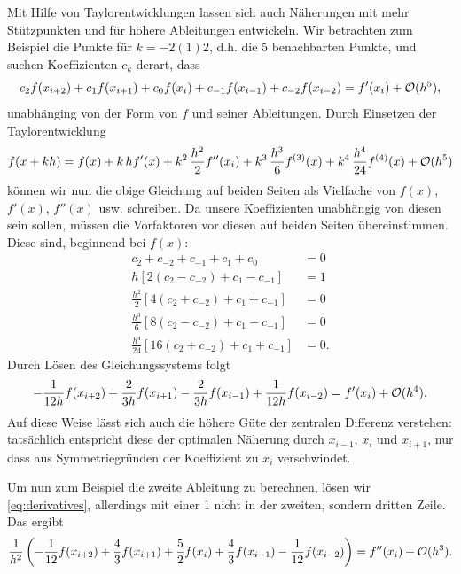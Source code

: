 Mit Hilfe von Taylorentwicklungen lassen sich auch Näherungen mit mehr
Stützpunkten und für höhere Ableitungen entwickeln.  Wir betrachten
zum Beispiel die Punkte für $k=-2(1)2$, d.h. die 5 benachbarten
Punkte, und suchen Koeffizienten $c_k$ derart, dass
\begin{equation}
  c_2 f(x_{i+2}) + c_1 f(x_{i+1})  + c_0 f(x_i) + c_{-1}f(x_{i-1}) +
  c_{-2}f(x_{i-2}) = f'(x_i) + \mathcal O(h^5),
\end{equation}
unabhänging von der Form von $f$ und seiner Ableitungen. Durch
Einsetzen der Taylorentwicklung
\begin{equation}
  f(x + k h) = f(x) + k\, hf'(x) + k^2\,\frac{h^2}{2} f''(x_i) +
  k^3\,\frac{h^3}{6}f^{(3)}(x) + k^4\,\frac{h^4}{24}f^{(4)}(x) + \mathcal O(h^5)
\end{equation}
können wir nun die obige Gleichung auf beiden Seiten als Vielfache von
$f(x)$, $f'(x)$, $f''(x)$ usw. schreiben. Da unsere Koeffizienten
unabhängig von diesen sein sollen, müssen die Vorfaktoren vor diesen
auf beiden Seiten übereinstimmen. Diese sind, beginnend bei $f(x)$:
\begin{align}
  \label{eq:derivatives}
  c_{2} + c_{-2} + c_{-1} + c_1 + c_0 &= 0\nonumber\\
  h\left[2 (c_{2} - c_{-2})  + c_{1} - c_{-1}\right] &= 1\nonumber\\
  \frac{h^2}{2}\left[4(c_{2} + c_{-2})  + c_{1} + c_{-1}\right] &= 0\nonumber\\
  \frac{h^3}{6}\left[8 (c_{2} - c_{-2})  + c_{1} - c_{-1}\right] &= 0\nonumber\\
  \frac{h^4}{24}\left[16 (c_{2} + c_{-2}) + c_{1} + c_{-1}\right] &= 0.
\end{align}
Durch Lösen des Gleichungssystems folgt
\begin{equation}
  \label{eq:4orderdiff}
  -\frac{1}{12h} f(x_{i+2}) + \frac{2}{3h} f(x_{i+1})  - \frac{2}{3h} f(x_{i-1}) +
  \frac{1}{12h}f(x_{i-2}) = f'(x_i) + \mathcal O(h^4).
\end{equation}
Auf diese Weise lässt sich auch die höhere Güte der zentralen
Differenz verstehen: tatsächlich entspricht diese der optimalen
Näherung durch $x_{i-1}$, $x_i$  und $x_{i+1}$, nur dass aus
Symmetriegründen der Koeffizient zu $x_i$ verschwindet.

Um nun zum Beispiel die zweite Ableitung zu berechnen, lösen wir
\eqref{eq:derivatives}, allerdings mit einer 1 nicht in der zweiten,
sondern dritten Zeile. Das ergibt
\begin{equation}
  \label{eq:3order2diff}
  \frac{1}{h^2}\left(-\frac{1}{12} f(x_{i+2}) + \frac{4}{3} f(x_{i+1}) +
  \frac{5}{2} f(x_i)  + \frac{4}{3} f(x_{i-1}) -
  \frac{1}{12}f(x_{i-2})\right) = f''(x_i) + \mathcal O(h^3).
\end{equation}

